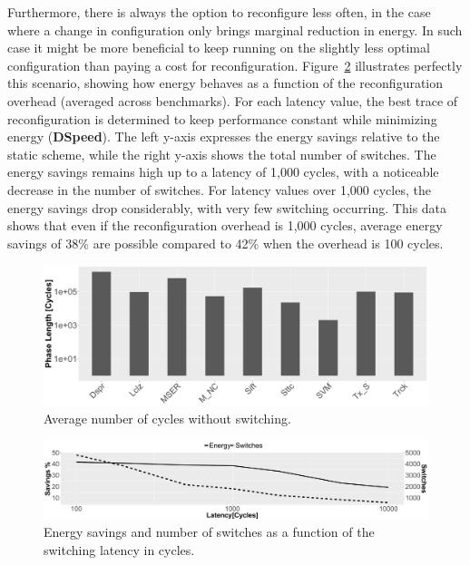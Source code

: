 Furthermore, there is always the option to reconfigure less often, in the case where a change in configuration only brings marginal reduction in energy.
In such case it might be more beneficial to keep running on the slightly less optimal configuration than paying a cost for reconfiguration.
Figure~\ref{fig:enlatency} illustrates perfectly this scenario, showing how energy behaves as a function of the reconfiguration overhead (averaged across benchmarks).
For each latency value, the best trace of reconfiguration is determined to keep performance constant while minimizing energy (\textbf{DSpeed}).
The left y-axis expresses the energy savings relative to the static scheme, while the right y-axis shows the total number of switches.
The energy savings remains high up to a latency of 1,000 cycles, with a noticeable decrease in the number of switches.
For latency values over 1,000 cycles, the energy savings drop considerably, with very few switching occurring.
This data shows that even if the reconfiguration overhead is 1,000 cycles, average energy savings of 38\% are possible compared to 42\% when the overhead is 100 cycles.

\begin{figure}[t]
    \centering
	\includegraphics[width=\textwidth]{cases-paper/graphics/Exploration/phase_len2.pdf}
    \caption{Average number of cycles without switching.}
    \label{fig:avlen}
\vspace{1em}
\end{figure}
\begin{figure}[t]
\centering
	\includegraphics[width=\textwidth]{cases-paper/graphics/Exploration/latency_en_sp_sw.pdf}
    \caption{Energy savings and number of switches as a function of the switching latency in cycles.}
    \label{fig:enlatency}
\vspace{5mm}
\end{figure}

